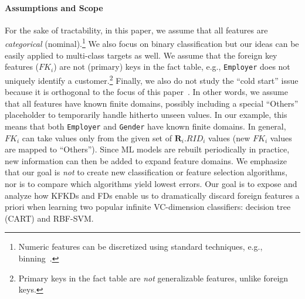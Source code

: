 \documentclass[sigconf]{acmart}
\newcommand{\eat}[1]{}
\begin{document}
\eat{
\paragraph*{Example}
Consider a common classification task for which ML classifiers are used, predicting \textit{customer churn}.
The fact table is \texttt{Customers} (\underline{\texttt{CustomerID}}, \texttt{Churn}, \texttt{Gender}, \texttt{Age}, \texttt{Employer}, \texttt{ZipCode}).
\texttt{Employer} and \texttt{Zipcode} are foreign key features that refer respectively to a customer's employer (e.g., Google or Microsoft) and the area 
where a customer lives. The respective dimension tables are \texttt{Employers} (\underline{\texttt{Employer}}, \texttt{State}, \texttt{Revenue}) 
and \texttt{Areas} (\underline{ZipCode}, \texttt{CrimeRate}, \texttt{AccidentRate}).
In such scenarios, data scientists typically join all base tables to bring in the extra features from the dimension tables. In this case, they might do so 
because of a hunch that customers employed by rich corporations in coastal states and living in ``safe'' areas are unlikely to churn.
}

\vspace{-1mm}
\paragraph*{\textbf{Assumptions and Scope}}
For the sake of tractability, in this paper, we assume that all features are \textit{categorical} (nominal).\footnote{Numeric features can be discretized 
using standard techniques, e.g., binning~\cite{mitchellbook}.} We also focus on binary classification but our ideas can be easily applied to multi-class targets as well.
We assume that the foreign key features ($FK_i$) are not (primary) keys in the fact table, e.g., \texttt{Employer} does not uniquely identify a customer.\footnote{Primary 
keys in the fact table are \textit{not} generalizable features, unlike foreign keys.}
Finally, we also do not study the ``cold start'' issue because it is orthogonal to the focus of this paper~\cite{coldstart}. In other words, we assume that all features 
have known finite domains, possibly including a special ``Others'' placeholder to temporarily handle hitherto unseen values. In our example, this means that both 
\texttt{Employer} and \texttt{Gender} have known finite domains. In general, $FK_i$ can take values only from the given set of $\textbf{R}_i.RID_i$ values 
(new $FK_i$ values are mapped to ``Others''). Since ML models are rebuilt periodically in practice, new information can then be added to expand feature domains. 
We emphasize that our goal is \textit{not} to create new classification or feature selection algorithms, nor is to compare which algorithms yield lowest errors.
Our goal is to expose and analyze how KFKDs and FDs enable us to dramatically discard foreign features a priori when learning two popular infinite VC-dimension 
classifiers: decision tree (CART) and RBF-SVM.
\end{document}
